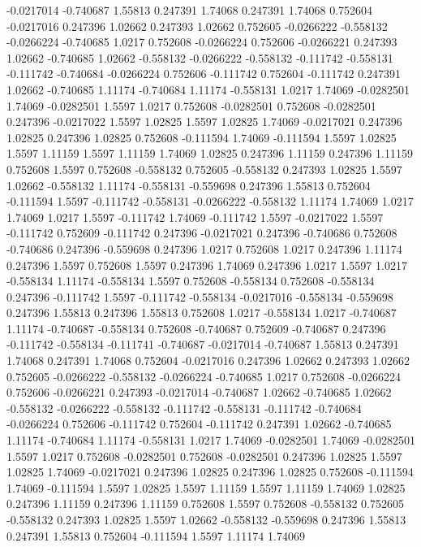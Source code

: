 -0.0217014 -0.740687
1.55813 0.247391
1.74068 0.247391
1.74068 0.752604
-0.0217016 0.247396
1.02662 0.247393
1.02662 0.752605
-0.0266222 -0.558132
-0.0266224 -0.740685
1.0217 0.752608
-0.0266224 0.752606
-0.0266221 0.247393
1.02662 -0.740685
1.02662 -0.558132
-0.0266222 -0.558132
-0.111742 -0.558131
-0.111742 -0.740684
-0.0266224 0.752606
-0.111742 0.752604
-0.111742 0.247391
1.02662 -0.740685
1.11174 -0.740684
1.11174 -0.558131
1.0217 1.74069
-0.0282501 1.74069
-0.0282501 1.5597
1.0217 0.752608
-0.0282501 0.752608
-0.0282501 0.247396
-0.0217022 1.5597
1.02825 1.5597
1.02825 1.74069
-0.0217021 0.247396
1.02825 0.247396
1.02825 0.752608
-0.111594 1.74069
-0.111594 1.5597
1.02825 1.5597
1.11159 1.5597
1.11159 1.74069
1.02825 0.247396
1.11159 0.247396
1.11159 0.752608
1.5597 0.752608
-0.558132 0.752605
-0.558132 0.247393
1.02825 1.5597
1.02662 -0.558132
1.11174 -0.558131
-0.559698 0.247396
1.55813 0.752604
-0.111594 1.5597
-0.111742 -0.558131
-0.0266222 -0.558132
1.11174 1.74069
1.0217 1.74069
1.0217 1.5597
-0.111742 1.74069
-0.111742 1.5597
-0.0217022 1.5597
-0.111742 0.752609
-0.111742 0.247396
-0.0217021 0.247396
-0.740686 0.752608
-0.740686 0.247396
-0.559698 0.247396
1.0217 0.752608
1.0217 0.247396
1.11174 0.247396
1.5597 0.752608
1.5597 0.247396
1.74069 0.247396
1.0217 1.5597
1.0217 -0.558134
1.11174 -0.558134
1.5597 0.752608
-0.558134 0.752608
-0.558134 0.247396
-0.111742 1.5597
-0.111742 -0.558134
-0.0217016 -0.558134
-0.559698 0.247396
1.55813 0.247396
1.55813 0.752608
1.0217 -0.558134
1.0217 -0.740687
1.11174 -0.740687
-0.558134 0.752608
-0.740687 0.752609
-0.740687 0.247396
-0.111742 -0.558134
-0.111741 -0.740687
-0.0217014 -0.740687
1.55813 0.247391
1.74068 0.247391
1.74068 0.752604
-0.0217016 0.247396
1.02662 0.247393
1.02662 0.752605
-0.0266222 -0.558132
-0.0266224 -0.740685
1.0217 0.752608
-0.0266224 0.752606
-0.0266221 0.247393
-0.0217014 -0.740687
1.02662 -0.740685
1.02662 -0.558132
-0.0266222 -0.558132
-0.111742 -0.558131
-0.111742 -0.740684
-0.0266224 0.752606
-0.111742 0.752604
-0.111742 0.247391
1.02662 -0.740685
1.11174 -0.740684
1.11174 -0.558131
1.0217 1.74069
-0.0282501 1.74069
-0.0282501 1.5597
1.0217 0.752608
-0.0282501 0.752608
-0.0282501 0.247396
1.02825 1.5597
1.02825 1.74069
-0.0217021 0.247396
1.02825 0.247396
1.02825 0.752608
-0.111594 1.74069
-0.111594 1.5597
1.02825 1.5597
1.11159 1.5597
1.11159 1.74069
1.02825 0.247396
1.11159 0.247396
1.11159 0.752608
1.5597 0.752608
-0.558132 0.752605
-0.558132 0.247393
1.02825 1.5597
1.02662 -0.558132
-0.559698 0.247396
1.55813 0.247391
1.55813 0.752604
-0.111594 1.5597
1.11174 1.74069
